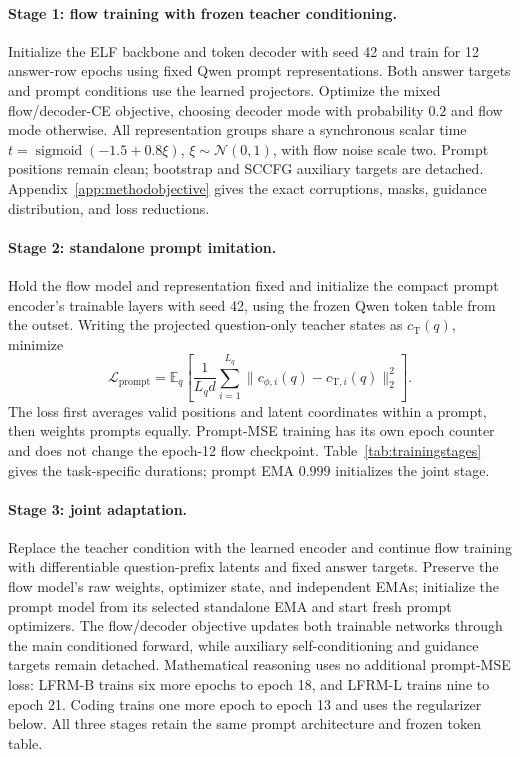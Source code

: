 \documentclass{article}
\newcommand{\E}{\mathbb{E}}
\begin{document}
\paragraph{Stage 1: flow training with frozen teacher conditioning.}
Initialize the ELF backbone and token decoder with seed 42 and train for 12 answer-row epochs using fixed Qwen prompt representations. Both answer targets and prompt conditions use the learned projectors. Optimize the mixed flow/decoder-CE objective, choosing decoder mode with probability $0.2$ and flow mode otherwise. All representation groups share a synchronous scalar time $t=\operatorname{sigmoid}(-1.5+0.8\xi)$, $\xi\sim\mathcal N(0,1)$, with flow noise scale two. Prompt positions remain clean; bootstrap and SCCFG auxiliary targets are detached. Appendix~\ref{app:methodobjective} gives the exact corruptions, masks, guidance distribution, and loss reductions.

\paragraph{Stage 2: standalone prompt imitation.}
Hold the flow model and representation fixed and initialize the compact prompt encoder's trainable layers with seed 42, using the frozen Qwen token table from the outset. Writing the projected question-only teacher states as $c_{\mathrm T}(q)$, minimize
\begin{equation}
 \mathcal L_{\mathrm{prompt}}=
 \E_q\!\left[\frac{1}{L_qd}\sum_{i=1}^{L_q}
 \|c_{\phi,i}(q)-c_{\mathrm T,i}(q)\|_2^2\right].
 \label{eq:methodpromptmse}
\end{equation}
The loss first averages valid positions and latent coordinates within a prompt, then weights prompts equally. Prompt-MSE training has its own epoch counter and does not change the epoch-12 flow checkpoint. Table~\ref{tab:trainingstages} gives the task-specific durations; prompt EMA $0.999$ initializes the joint stage.

\paragraph{Stage 3: joint adaptation.}
Replace the teacher condition with the learned encoder and continue flow training with differentiable question-prefix latents and fixed answer targets. Preserve the flow model's raw weights, optimizer state, and independent EMAs; initialize the prompt model from its selected standalone EMA and start fresh prompt optimizers. The flow/decoder objective updates both trainable networks through the main conditioned forward, while auxiliary self-conditioning and guidance targets remain detached. Mathematical reasoning uses no additional prompt-MSE loss: LFRM-B trains six more epochs to epoch 18, and LFRM-L trains nine to epoch 21. Coding trains one more epoch to epoch 13 and uses the regularizer below. All three stages retain the same prompt architecture and frozen token table.
\end{document}
